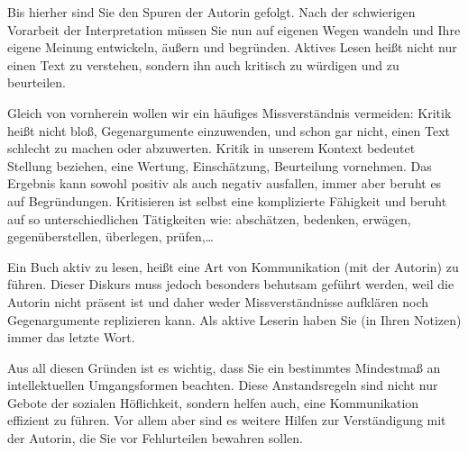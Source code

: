 \documentclass[]{book}
\theoremstyle{definition}
\theoremstyle{definition}
\theoremstyle{definition}
\theoremstyle{remark}
\begin{document}
Bis hierher sind Sie den Spuren der Autorin gefolgt. Nach der
schwierigen Vorarbeit der Interpretation müssen Sie nun auf eigenen
Wegen wandeln und Ihre eigene Meinung entwickeln, äußern und begründen.
Aktives Lesen heißt nicht nur einen Text zu verstehen, sondern ihn auch
kritisch zu würdigen und zu beurteilen.

Gleich von vornherein wollen wir ein häufiges Missverständnis vermeiden:
Kritik heißt nicht bloß, Gegenargumente einzuwenden, und schon gar
nicht, einen Text schlecht zu machen oder abzuwerten. Kritik in unserem
Kontext bedeutet Stellung beziehen, eine Wertung, Einschätzung,
Beurteilung vornehmen. Das Ergebnis kann sowohl positiv als auch negativ
ausfallen, immer aber beruht es auf Begründungen. Kritisieren ist selbst
eine komplizierte Fähigkeit und beruht auf so unterschiedlichen
Tätigkeiten wie: abschätzen, bedenken, erwägen, gegenüberstellen,
überlegen, prüfen,\ldots{}

Ein Buch aktiv zu lesen, heißt eine Art von Kommunikation (mit der
Autorin) zu führen. Dieser Diskurs muss jedoch besonders behutsam
geführt werden, weil die Autorin nicht präsent ist und daher weder
Missverständnisse aufklären noch Gegenargumente replizieren kann. Als
aktive Leserin haben Sie (in Ihren Notizen) immer das letzte Wort.

Aus all diesen Gründen ist es wichtig, dass Sie ein bestimmtes
Mindestmaß an intellektuellen Umgangsformen beachten. Diese
Anstandsregeln sind nicht nur Gebote der sozialen Höflichkeit, sondern
helfen auch, eine Kommunikation effizient zu führen. Vor allem aber sind
es weitere Hilfen zur Verständigung mit der Autorin, die Sie vor
Fehlurteilen bewahren sollen.
\end{document}
